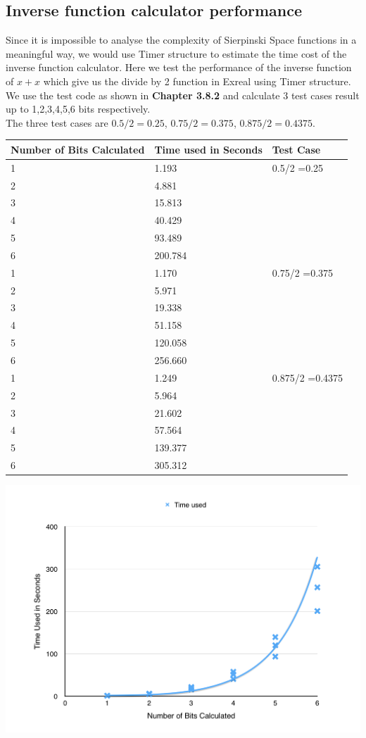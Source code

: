 \documentclass[12pt,twoside,notitlepage]{report}
\begin{document}
\subsection{Inverse function calculator performance}
Since it is impossible to analyse the complexity of Sierpinski Space functions in a meaningful way, we would use Timer structure to estimate the time cost of the inverse function calculator. Here we test the performance of the inverse function of $x+x$ which give us the divide by 2 function in Exreal using Timer structure. We use the test code as shown in \textbf{Chapter 3.8.2} and calculate 3 test cases result up to 1,2,3,4,5,6 bits respectively. \\
The three test cases are $0.5/2 = 0.25$, $0.75/2 = 0.375$, $0.875/2 = 0.4375$. 

\begin{longtable}{| l | l | l |}
	\hline
    	Number of Bits Calculated & Time used in Seconds & Test Case \\ \hline
	1 & 1.193 & 0.5/2 =0.25 \\ \hline
	2 & 4.881 & \\ \hline
	3 & 15.813 & \\ \hline
	4 & 40.429 & \\ \hline
	5 & 93.489 & \\ \hline
	6 & 200.784 & \\ \hline
	1 & 1.170 & 0.75/2 =0.375 \\ \hline
	2 & 5.971 & \\ \hline
	3 & 19.338 & \\ \hline
	4 & 51.158 & \\ \hline
	5 & 120.058 & \\ \hline
	6 & 256.660 & \\ \hline
	1 & 1.249 & 0.875/2 =0.4375 \\ \hline
	2 & 5.964 & \\ \hline
	3 & 21.602 & \\ \hline
	4 & 57.564 & \\ \hline
	5 & 139.377 & \\ \hline
	6 & 305.312 & \\ \hline
\end{longtable}

\includegraphics [width=\textwidth] {invres}
\end{document}

